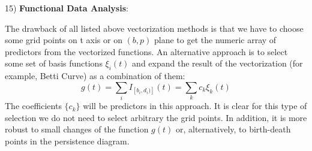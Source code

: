\documentclass[conference, onecolumn]{IEEEtran}
\begin{document}
15) \textbf{Functional Data Analysis}:

The drawback of all listed above vectorization methods is that we have to choose some grid points on t axis or on $(b,p)$ plane to get the numeric array of predictors from the vectorized functions. An alternative approach is to select some set of basis functions $\xi_i(t)$ and expand the result of the vectorization (for example, Betti Curve) as a combination of them:
$$
g(t) = \sum_i I_{[b_i,d_i)]}(t) = \sum_k c_k \xi_k(t)
$$
The coefficients $\{c_k\}$ will be predictors in this approach. It is clear for this type of selection we do not need to select arbitrary the grid points. In addition, it is more robust to small changes of the function $g(t)$ or, alternatively, to birth-death points in the persistence diagram.
\end{document}
